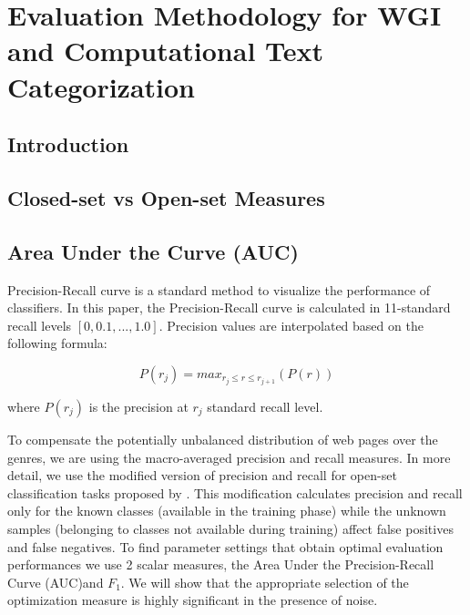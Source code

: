 
\chapter{Evaluation Methodology for WGI and Computational Text Categorization}

\label{chap:eval_methods}


\newcommand{\keyword}[1]{\textbf{#1}}
\newcommand{\tabhead}[1]{\textbf{#1}}
\newcommand{\code}[1]{\texttt{#1}}
\newcommand{\file}[1]{\texttt{\bfseries#1}}
\newcommand{\option}[1]{\texttt{\itshape#1}}


\section{Introduction}\label{chap:eval_mentods:sec:intro}

\section{Closed-set vs Open-set Measures}\label{chap:eval_mentods:sec:Measures} 

\section{Area Under the Curve (AUC)}\label{chap:eval_mentods:sec:closed_set_classification} 

Precision-Recall curve is a standard method to visualize the performance of classifiers. In this paper, the Precision-Recall curve is calculated in 11-standard recall levels $[0,0.1,...,1.0]$. Precision values are interpolated based on the following formula:

\begin{equation}
	P(r_j)=max_{r_j \leqslant r \leqslant r_{j+1}}(P(r))
\end{equation}

\noindent
where $P(r_j)$ is the precision at $r_j$ standard recall level.

To compensate the potentially unbalanced distribution of web pages over the genres, we are using the macro-averaged precision and recall measures. In more detail, we use the modified version of precision and recall for open-set classification tasks proposed by \citep{mendesjunior2016}. This modification calculates precision and recall only for the known classes (available in the training phase) while the unknown samples (belonging to classes not available during training) affect false positives and false negatives. To find parameter settings that obtain optimal evaluation performances we use 2 scalar measures, the Area Under the Precision-Recall Curve (AUC)and $F_{1}$. We will show that the appropriate selection of the optimization measure is highly significant in the presence of noise.

